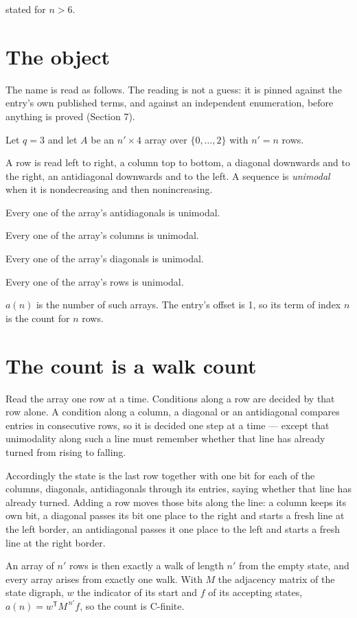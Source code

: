 \documentclass[11pt]{article}
\theoremstyle{definition}
\begin{document}
stated for $n > 6$.

\section{The object}

The name is read as follows. The reading is not a guess: it is pinned against the entry's own published terms, and against an independent enumeration, before anything is proved (Section 7).

Let $q = 3$ and let $A$ be an $n' \times 4$ array over $\{0,\dots,2\}$ with $n' = n$ rows.

A row is read left to right, a column top to bottom, a diagonal downwards and to the right, an antidiagonal downwards and to the left. A sequence is {\itshape unimodal} when it is nondecreasing and then nonincreasing.

Every one of the array's antidiagonals is unimodal.

Every one of the array's columns is unimodal.

Every one of the array's diagonals is unimodal.

Every one of the array's rows is unimodal.

$a(n)$ is the number of such arrays. The entry's offset is 1, so its term of index $n$ is the count for $n$ rows.

\section{The count is a walk count}

Read the array one row at a time. Conditions along a row are decided by that row alone. A condition along a column, a diagonal or an antidiagonal compares entries in consecutive rows, so it is decided one step at a time --- except that unimodality along such a line must remember whether that line has already turned from rising to falling.

Accordingly the state is the last row together with one bit for each of the columns, diagonals, antidiagonals through its entries, saying whether that line has already turned. Adding a row moves those bits along the line: a column keeps its own bit, a diagonal passes its bit one place to the right and starts a fresh line at the left border, an antidiagonal passes it one place to the left and starts a fresh line at the right border.

An array of $n'$ rows is then exactly a walk of length $n'$ from the empty state, and every array arises from exactly one walk. With $M$ the adjacency matrix of the state digraph, $w$ the indicator of its start and $f$ of its accepting states, $a(n) = w^{\mathsf T}M^{\,n'}f$, so the count is C-finite.
\end{document}
